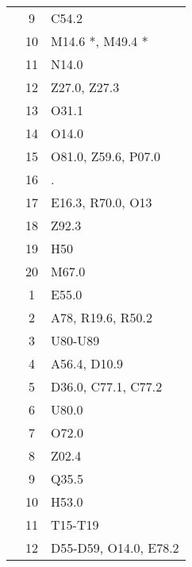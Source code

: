 \begin{table}[htbp]
\begin{tabular}{c c l}
	 & 9 & C54.2 \\
	 & 10 & M14.6 *, M49.4 * \\
	 & 11 & N14.0 \\
	 & 12 & Z27.0, Z27.3 \\
	 & 13 & O31.1 \\
	 & 14 & O14.0 \\
	 & 15 & O81.0, Z59.6, P07.0 \\
	 & 16 & . \\
	 & 17 & E16.3, R70.0, O13 \\
	 & 18 & Z92.3 \\
	 & 19 & H50 \\
	 & 20 & M67.0 \\
	\addlinespace
	8 & 1 & E55.0 \\
	 & 2 & A78, R19.6, R50.2 \\
	 & 3 & U80-U89 \\
	 & 4 & A56.4, D10.9 \\
	 & 5 & D36.0, C77.1, C77.2 \\
	 & 6 & U80.0 \\
	 & 7 & O72.0 \\
	 & 8 & Z02.4 \\
	 & 9 & Q35.5 \\
	 & 10 & H53.0 \\
	 & 11 & T15-T19 \\
	 & 12 & D55-D59, O14.0, E78.2 \\
	\bottomrule
\end{tabular}
\end{table}


